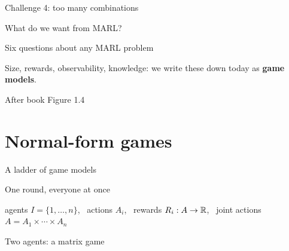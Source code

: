 \documentclass[aspectratio=169,11pt]{beamer}
\begin{document}
\begin{frame}{Challenge 4: too many combinations}
  \centering
  

\end{frame}

\begin{frame}{What do we want from MARL?}
  \centering
  
  \par{}
\end{frame}

\begin{frame}{Six questions about any MARL problem}
  \centering
  
  \medskip

  {\small Size, rewards, observability, knowledge: we write these down today as \textbf{game models}.}\par{\scriptsize\color{cgray} After book Figure 1.4}
\end{frame}


\section{Normal-form games}

\begin{frame}{A ladder of game models}
  \centering
  \vfill
  
  \vfill
  \par{}
\end{frame}

\begin{frame}{One round, everyone at once}
  \centering
  \vfill
  
  \vfill
  {\small agents $I = \{1,\dots,n\}$, \ actions $A_i$, \ rewards $R_i : A \to \mathbb{R}$, \ joint actions $A = A_1 \times \cdots \times A_n$}
  \par{}
\end{frame}

\begin{frame}{Two agents: a matrix game}
  \centering
  \vfill
  
  \vfill
  \par{}
\end{frame}
\end{document}
